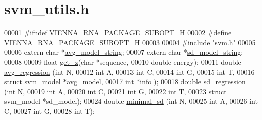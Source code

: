 \hypertarget{svm__utils_8h_source}{}\section{svm\+\_\+utils.\+h}
\label{svm__utils_8h_source}

\begin{DoxyCode}
00001 \textcolor{preprocessor}{#ifndef VIENNA\_RNA\_PACKAGE\_SUBOPT\_H}
00002 \textcolor{preprocessor}{#define VIENNA\_RNA\_PACKAGE\_SUBOPT\_H}
00003 
00004 \textcolor{preprocessor}{#include "svm.h"}
00005 
00006 \textcolor{keyword}{extern}  \textcolor{keywordtype}{char} *\mbox{\hyperlink{svm__utils_8h_a882fe0794ca32aad1e1682ea38689045}{avg\_model\_string}};
00007 \textcolor{keyword}{extern}  \textcolor{keywordtype}{char} *\mbox{\hyperlink{svm__utils_8h_a291a03d64d5fba49646fd017e22494b2}{sd\_model\_string}};
00008 
00009 \textcolor{keywordtype}{float}     \mbox{\hyperlink{svm__utils_8h_ae607dddedebc9afa16c5dff3bba1394f}{get\_z}}(\textcolor{keywordtype}{char} *sequence,
00010                 \textcolor{keywordtype}{double} energy);
00011 \textcolor{keywordtype}{double}    \mbox{\hyperlink{svm__utils_8h_a88269e88d6fd467dddac2d7e3721980b}{avg\_regression}} (\textcolor{keywordtype}{int} N,
00012                           \textcolor{keywordtype}{int} A,
00013                           \textcolor{keywordtype}{int} C,
00014                           \textcolor{keywordtype}{int} G,
00015                           \textcolor{keywordtype}{int} T,
00016                           \textcolor{keyword}{struct} svm\_model *avg\_model,
00017                           \textcolor{keywordtype}{int} *info );
00018 \textcolor{keywordtype}{double}    \mbox{\hyperlink{svm__utils_8h_aa8d1363adb772aa84daeeddb7fe6aff6}{sd\_regression}}  (\textcolor{keywordtype}{int} N,
00019                           \textcolor{keywordtype}{int} A,
00020                           \textcolor{keywordtype}{int} C,
00021                           \textcolor{keywordtype}{int} G,
00022                           \textcolor{keywordtype}{int} T,
00023                           \textcolor{keyword}{struct} svm\_model  *sd\_model);
00024 \textcolor{keywordtype}{double}    \mbox{\hyperlink{svm__utils_8h_ada672a00584fc57b842ae1328b0d9c72}{minimal\_sd}}     (\textcolor{keywordtype}{int} N,
00025                           \textcolor{keywordtype}{int} A,
00026                           \textcolor{keywordtype}{int} C,
00027                           \textcolor{keywordtype}{int} G,
00028                           \textcolor{keywordtype}{int} T);

\end{DoxyCode}
